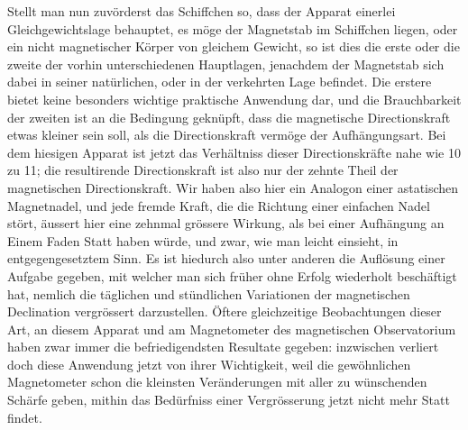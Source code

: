 Stellt man nun zuvörderst das Schiffchen so, dass der Apparat einerlei Gleichgewichtslage behauptet, es möge der Magnetstab im Schiffchen liegen, oder ein nicht magnetischer Körper von gleichem Gewicht, so ist dies die erste oder die zweite der vorhin unterschiedenen Hauptlagen, jenachdem der Magnetstab sich dabei in seiner natürlichen, oder in der verkehrten Lage befindet. Die erstere bietet keine besonders wichtige praktische Anwendung dar, und die Brauchbarkeit der zweiten ist an die Bedingung geknüpft, dass die magnetische Directionskraft etwas kleiner sein soll, als die Directionskraft vermöge der Aufhängungsart. Bei dem hiesigen Apparat ist jetzt das Verhältniss dieser Directionskräfte nahe wie 10 zu 11; die resultirende Directionskraft ist also nur der zehnte Theil der magnetischen Directionskraft. Wir haben also hier ein Analogon einer astatischen Magnetnadel, und jede fremde Kraft, die die Richtung einer einfachen Nadel stört, äussert hier eine zehnmal grössere Wirkung, als bei einer Aufhängung an Einem Faden Statt haben würde, und zwar, wie man leicht einsieht, in entgegengesetztem Sinn. Es ist hiedurch also unter anderen die Auflösung einer Aufgabe gegeben, mit welcher man sich früher ohne Erfolg wiederholt beschäftigt hat, nemlich die täglichen und stündlichen Variationen der magnetischen Declination vergrössert darzustellen. Öftere gleichzeitige Beobachtungen dieser Art, an diesem Apparat und am Magnetometer des magnetischen Observatorium haben zwar immer die befriedigendsten Resultate gegeben: inzwischen verliert doch diese Anwendung jetzt von ihrer Wichtigkeit, weil die gewöhnlichen Magnetometer schon die kleinsten Veränderungen mit aller zu wünschenden Schärfe geben, mithin das Bedürfniss einer Vergrösserung jetzt nicht mehr Statt findet.

